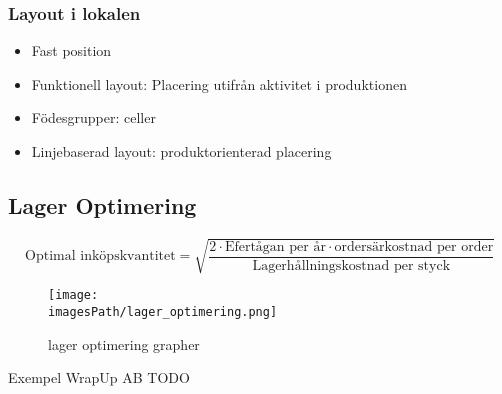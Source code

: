 \subsubsection{Layout i lokalen}
\begin{itemize}
    \item Fast position 
    \item Funktionell layout: Placering utifrån aktivitet i produktionen
    \item Födesgrupper: celler 
    \item Linjebaserad layout: produktorienterad placering
\end{itemize}

\subsection{Lager Optimering}
\begin{equation*}
    \text{Optimal inköpskvantitet} 
    = \sqrt{\frac{ 2\cdot\text{Efertågan per år}\cdot\text{ordersärkostnad per order} }{ \text{Lagerhållningskostnad per styck} }}
\end{equation*}

\begin{figure}[!h]
    \centering
    \texttt{[image: \\imagesPath/lager\_optimering.png]}
    \caption{lager optimering grapher}
\end{figure}

\begin{exampleblock}{Exempel WrapUp AB}
   TODO 
\end{exampleblock}

